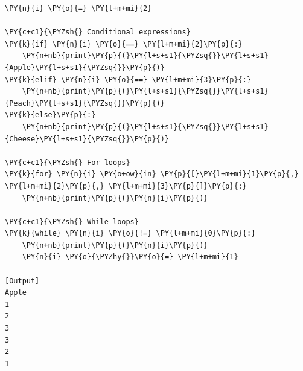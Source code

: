 \begin{Verbatim}[label=\makebox{\url{https://github.com/lucabaldini/cmepda/tree/master/slides/latex/snippets/control\_flow.py}},commandchars=\\\{\}]
\PY{n}{i} \PY{o}{=} \PY{l+m+mi}{2}

\PY{c+c1}{\PYZsh{} Conditional expressions}
\PY{k}{if} \PY{n}{i} \PY{o}{==} \PY{l+m+mi}{2}\PY{p}{:}
    \PY{n+nb}{print}\PY{p}{(}\PY{l+s+s1}{\PYZsq{}}\PY{l+s+s1}{Apple}\PY{l+s+s1}{\PYZsq{}}\PY{p}{)}
\PY{k}{elif} \PY{n}{i} \PY{o}{==} \PY{l+m+mi}{3}\PY{p}{:}
    \PY{n+nb}{print}\PY{p}{(}\PY{l+s+s1}{\PYZsq{}}\PY{l+s+s1}{Peach}\PY{l+s+s1}{\PYZsq{}}\PY{p}{)}
\PY{k}{else}\PY{p}{:}
    \PY{n+nb}{print}\PY{p}{(}\PY{l+s+s1}{\PYZsq{}}\PY{l+s+s1}{Cheese}\PY{l+s+s1}{\PYZsq{}}\PY{p}{)}

\PY{c+c1}{\PYZsh{} For loops}
\PY{k}{for} \PY{n}{i} \PY{o+ow}{in} \PY{p}{[}\PY{l+m+mi}{1}\PY{p}{,} \PY{l+m+mi}{2}\PY{p}{,} \PY{l+m+mi}{3}\PY{p}{]}\PY{p}{:}
    \PY{n+nb}{print}\PY{p}{(}\PY{n}{i}\PY{p}{)}

\PY{c+c1}{\PYZsh{} While loops}
\PY{k}{while} \PY{n}{i} \PY{o}{!=} \PY{l+m+mi}{0}\PY{p}{:}
    \PY{n+nb}{print}\PY{p}{(}\PY{n}{i}\PY{p}{)}
    \PY{n}{i} \PY{o}{\PYZhy{}}\PY{o}{=} \PY{l+m+mi}{1}

[Output]
Apple
1
2
3
3
2
1
\end{Verbatim}